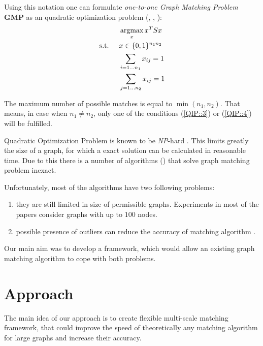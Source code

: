 \documentclass[
	fontsize=12pt,
	paper=a4,
	twoside=false,
	numbers=noenddot,
	plainheadsepline,
	toc=listof,
	toc=bibliography
]{scrartcl}
\def\argmax{\mathop{\rm argmax}}
\begin{document}
Using this notation one can formulate \emph{one-to-one Graph Matching Problem} \textbf{GMP} as an quadratic optimization problem (\cite{Cho2014_Haystack}, \cite{Cho2012_ProgressiveGM}, \cite{Cho2010_RRWM}): 
\begin{alignat}{2}
    &     && \argmax_x{x^TSx}                           \label{QIP::1}\\
    & \text{s.t. } &&  x\in \{0,1\}^{n_1n_2}            \label{QIP::2}\\
    &             &&  \sum_{i=1\dots n_1} x_{ij} = 1    \label{QIP::3}\\
    &             &&  \sum_{j=1\dots n_2} x_{ij} = 1    \label{QIP::4}
 \end{alignat}
 
The maximum number of possible matches is equal to $\min(n_1, n_2)$. That means, in case when $n_1\not = n_2$, only one of the conditions (\ref{QIP::3}) or (\ref{QIP::4}) will be fulfilled.

Quadratic Optimization Problem is known to be \emph{NP}-hard \cite{Sahni1974}. This limits greatly the size of a graph, for which a exact solution can be calculated in reasonable time. Due to this there is a number of algorithms () that solve graph matching problem inexact.

Unfortunately, most of the algorithms have two following problems:
\begin{enumerate}
\item they are still limited in size of permissible graphs. Experiments in most of the papers consider graphs with up to $100$ nodes.
\item possible presence of outliers can reduce the accuracy of matching algorithm \cite{Suh_CVPR2015}.
\end{enumerate}  

Our main aim was to develop a framework, which would allow an existing graph matching algorithm to cope with both problems.


\section{Approach}

The main idea of our approach is to create flexible multi-scale matching framework, that could improve the speed of
theoretically any matching algorithm for large graphs and increase their accuracy. 
\end{document}
